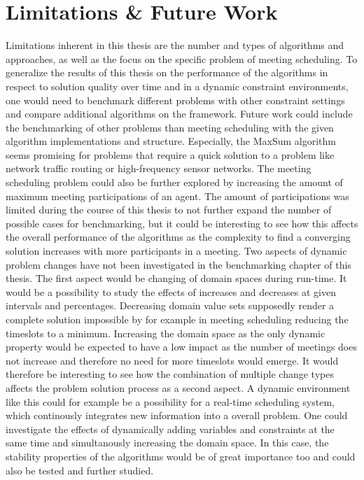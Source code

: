 \chapter{Limitations \& Future Work}
\label{c:limitations}
Limitations inherent in this thesis are the number and types of algorithms and approaches, as well as the focus on the specific problem of meeting scheduling. To generalize the results of this thesis on the performance of the algorithms in respect to solution quality over time and in a dynamic constraint environments, one would need to benchmark different problems with other constraint settings and compare additional algorithms on the framework. 
Future work could include the benchmarking of other problems than meeting scheduling with the given algorithm implementations and structure. Especially, the MaxSum algorithm seems promising for problems that require a quick solution to a problem like network traffic routing or high-frequency sensor networks. The meeting scheduling problem could also be further explored by increasing the amount of maximum meeting participations of an agent. The amount of participations was limited during the course of this thesis to not further expand the number of possible cases for benchmarking, but it could be interesting to see how this affects the overall performance of the algorithms as the complexity to find a converging solution increases with more participants in a meeting.
 \newline \newline
 Two aspects of dynamic problem changes have not been investigated in the benchmarking chapter of this thesis. The first aspect would be changing of domain spaces during run-time. It would be a possibility to study the effects of  increases and decreases at given intervals and percentages. Decreasing domain value sets supposedly render a complete solution impossible by for example in meeting scheduling reducing the timeslots to a minimum.  Increasing the domain space as the only dynamic property would be expected to have a low impact as the number of meetings does not increase and therefore no need for more timeslots would emerge. It would therefore be interesting to see how the combination of multiple change types affects the problem solution process as a second aspect. A dynamic environment like this could for example be a possibility for a real-time scheduling system, which continously integrates new information into a overall problem. One could investigate the effects of dynamically adding variables and constraints at the same time and simultanously increasing the domain space. In this case, the stability properties of the algorithms would be of great importance too and could also be tested and further studied.
 

 